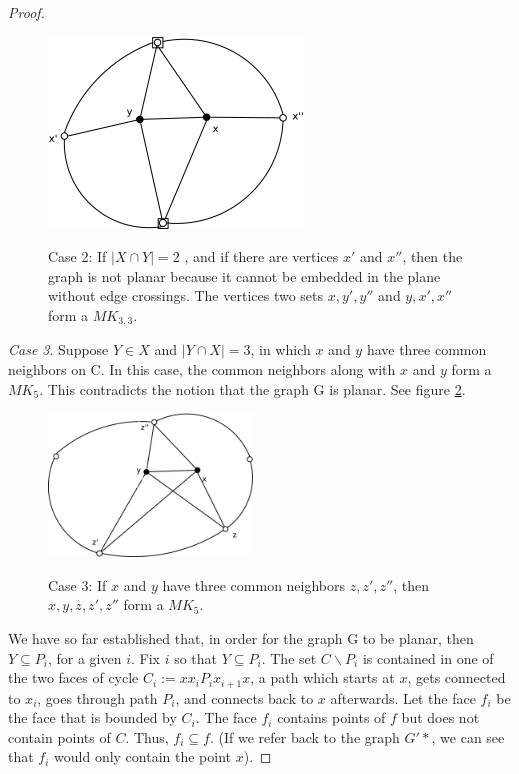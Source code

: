 \begin{proof}
\begin{figure}[htbp]
	\centering
	\includegraphics[height=2in]{case2.eps} \\ 
	\caption{Case 2: If $|X\cap Y| = 2$ , and if there are vertices $x'$ and $x''$, then the graph is not planar because it cannot be embedded in the plane without edge crossings. The vertices two sets $x,y',y''$ and $y,x',x''$ form a $MK_{3,3}$.}
\label{case2}
\end{figure}

\emph{Case 3}. Suppose $Y \in X$ and $|Y \cap X| = 3$, in which $x$ and $y$ have three common neighbors on C. In this case, the common neighbors along with $x$ and $y$ form a $MK_5$. This contradicts the notion that the graph G is planar. See figure \ref{case3}.

\begin{figure}[htbp]
	\centering
	\includegraphics[height=1.5in]{case3.eps} \\ 
	\caption{Case 3: If $x$ and $y$ have three common neighbors $z, z',z''$, then $x,y,z,z',z''$ form a $MK_5$.}
\label{case3}
\end{figure}


We have so far established that, in order for the graph G to be planar, then $Y \subseteq P_i$, for a given $i$. Fix $i$ so that $Y \subseteq P_i$. The set $C \backslash P_i$ is contained in one of the two faces of cycle $C_i:= x x_i P_i x_{i+1} x$, a path which starts at $x$, gets connected to $x_i$, goes through path $P_i$, and connects back to $x$ afterwards. Let the face $f_i$ be the face that is bounded by $C_i$. The face $f_i$ contains points of $f$ but does not contain points of $C$. Thus, $f_i \subseteq f$. (If we refer back to the graph $G'*$, we can see that $f_i$ would only contain the point $x$). 


\end{proof}
